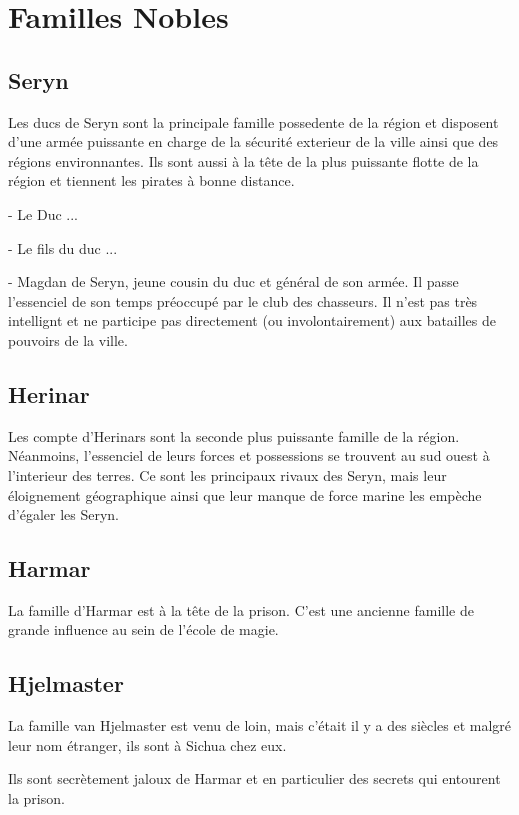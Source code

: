 \section{Familles Nobles}

\subsection*{Seryn}

Les ducs de Seryn sont la principale famille possedente de la région et disposent
d'une armée puissante en charge de la sécurité exterieur de la ville ainsi que
des régions environnantes. Ils sont aussi à la tête de la plus puissante flotte de 
la région et tiennent les pirates à bonne distance.

- Le Duc ...

- Le fils du duc ...

- Magdan de Seryn, jeune cousin du duc et général de son armée. Il passe
  l'essenciel de son temps préoccupé par le club des chasseurs. Il n'est
  pas très intellignt et ne participe pas directement (ou involontairement)
  aux batailles de pouvoirs de la ville.

\subsection*{Herinar}

Les compte d'Herinars sont la seconde plus puissante famille de la région. Néanmoins,
l'essenciel de leurs forces et possessions se trouvent au sud ouest à l'interieur
des terres. Ce sont les principaux rivaux des Seryn, mais leur éloignement
géographique ainsi que leur manque de force marine les empèche d'égaler les Seryn.

\subsection*{Harmar}

La famille d'Harmar est à la tête de la prison. C'est une ancienne famille de 
grande influence au sein de l'école de magie.

\subsection*{Hjelmaster}

La famille van Hjelmaster est venu de loin, mais c'était il y a des 
siècles et malgré leur nom étranger, ils sont à Sichua chez eux.

Ils sont secrètement jaloux de Harmar et en particulier des secrets
qui entourent la prison.

